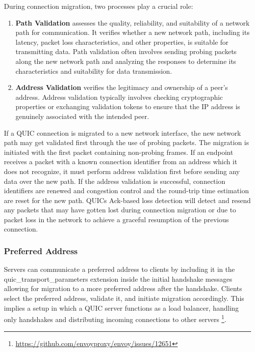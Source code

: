 During connection migration, two processes play a crucial role:
\begingroup
\renewcommand\labelenumi{(\theenumi)}
\begin{enumerate}
\item \textbf{Path Validation} assesses the quality, reliability, and suitability of a network path for communication. It verifies
whether a new network path, including its latency, packet loss characteristics, and other properties, is suitable for transmitting
data. Path validation often involves sending probing packets along the new network path and analyzing the responses to determine its
characteristics and suitability for data transmission.\cite[46]{rfc9000} \label{path_validation}
\item \textbf{Address Validation} verifies the legitimacy and ownership of a peer's address. Address validation typically
involves checking cryptographic properties or exchanging validation tokens to ensure that the IP address is genuinely associated
with the intended peer. \cite[42]{rfc9000} \label{address_validation}
\end{enumerate}
\endgroup

If a QUIC connection is migrated to a new network interface, the new network path may get validated first through the use of probing
packets. The migration is initiated with the first packet containing non-probing frames. If an endpoint receives a packet with a
known connection identifier from an address which it does not recognize, it must perform address validation first before sending
any data over the new path. If the address validation is successful, connection identifiers are renewed and congestion control and
the round-trip time estimation are reset for the new path. QUICs Ack-based loss detection will detect and resend any packets that
may have gotten lost during connection migration or due to packet loss in the network to achieve a graceful resumption of the
previous connection.

\subsubsection{Preferred Address}

Servers can communicate a preferred address to clients by including it in the \\ quic\_transport\_parameters extension inside the initial handshake messages allowing for migration to a more preferred address after the handshake. Clients select the preferred address, validate it, and initiate migration accordingly. This implies a setup in which a QUIC server functions as a load balancer, handling only handshakes and distributing incoming connections to other servers \footnote{\url{https://github.com/envoyproxy/envoy/issues/12651}}.

